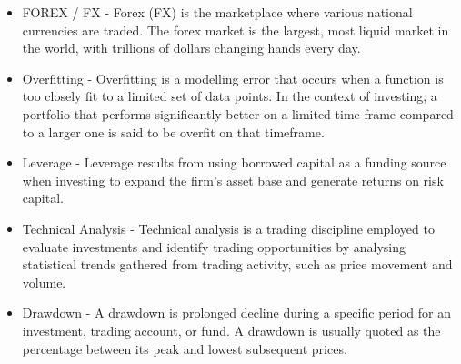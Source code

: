 \documentclass[main.tex]{subfiles}
\begin{document}
\begin{itemize}
\item FOREX / FX - Forex (FX) is the marketplace where various national currencies are traded. The forex market is the largest, most liquid market in the world, with trillions of dollars changing hands every day.
\item Overfitting - Overfitting is a modelling error that occurs when a function is too closely fit to a limited set of data points. In the context of investing, a portfolio that performs significantly better on a limited time-frame compared to a larger one is said to be overfit on that timeframe. 
\item Leverage - Leverage results from using borrowed capital as a funding source when
investing to expand the firm's asset base and generate returns on risk
capital.
\item Technical Analysis - Technical analysis is a trading discipline employed to
evaluate investments and identify trading opportunities by analysing
statistical trends gathered from trading activity, such as price
movement and volume. 
\item Drawdown - A drawdown is prolonged decline during a specific period for an investment, trading account, or fund. A drawdown is usually quoted as the percentage between its peak and lowest subsequent prices. 
\end{itemize}
\end{document}
